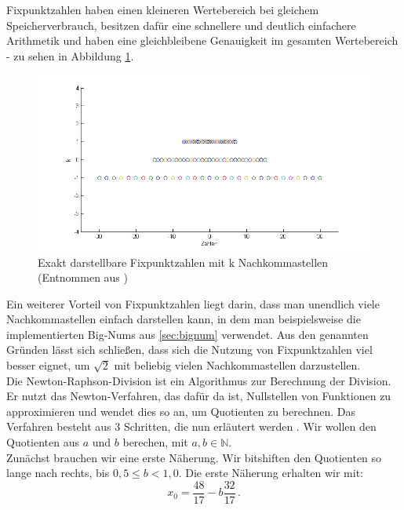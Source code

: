 \documentclass[course=erap]{aspdoc}
\begin{document}
Fixpunktzahlen haben einen kleineren Wertebereich bei gleichem Speicherverbrauch, besitzen dafür eine schnellere und deutlich einfachere Arithmetik und haben eine gleichbleibene Genauigkeit im gesamten Wertebereich - zu sehen in Abbildung \ref{img:fixpunktzahlen-wertebereich}.

\begin{figure}[h] \centering
  \includegraphics[scale=0.4]{graphiken/fixpunktzahlen-wertebereich.png} 
  \caption{Exakt darstellbare Fixpunktzahlen mit k Nachkommastellen (Entnommen aus \cite{fixpunktzahlen})} \label{img:fixpunktzahlen-wertebereich}
\end{figure} 

Ein weiterer Vorteil von Fixpunktzahlen liegt darin, dass man unendlich viele Nachkommastellen einfach darstellen kann, in dem man beispielsweise die implementierten Big-Nums aus \ref{sec:bignum} verwendet. Aus den
genannten Gründen lässt sich schließen, dass sich die Nutzung von Fixpunktzahlen viel besser eignet, um $\sqrt{2}$ mit beliebig vielen Nachkommastellen darzustellen. \\

Die Newton-Raphson-Division ist ein Algorithmus zur Berechnung der Division. Er nutzt das Newton-Verfahren, das dafür da ist, Nullstellen von Funktionen zu approximieren und wendet dies so an, um Quotienten zu berechnen. 
Das Verfahren besteht aus 3 Schritten, die nun erläutert werden \cite{newton_raphson_division}. Wir wollen den Quotienten aus $a$ und $b$ berechen, mit $a, b \in \mathbb{N}$. \\
Zunächst brauchen wir eine erste Näherung. Wir bitshiften den Quotienten so lange nach rechts, bis $0,5 \leq b < 1,0$. Die erste Näherung erhalten wir mit:
\begin{equation} \label{eq:erste_naeherung}
  x_0 = \frac{48}{17} - b \frac{32}{17} \, .
\end{equation}
\end{document}
